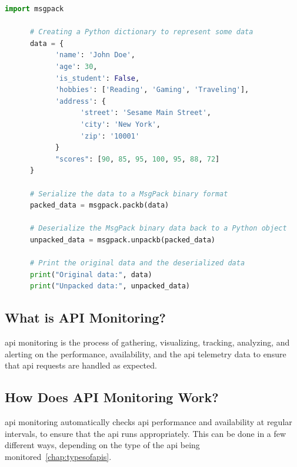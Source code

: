 \begin{lstlisting}[language=Python, caption=MsgPack Serialization and Deserialization in Python]
      import msgpack

      # Creating a Python dictionary to represent some data
      data = {
            'name': 'John Doe',
            'age': 30,
            'is_student': False,
            'hobbies': ['Reading', 'Gaming', 'Traveling'],
            'address': {
                  'street': 'Sesame Main Street',
                  'city': 'New York',
                  'zip': '10001'
            }
            "scores": [90, 85, 95, 100, 95, 88, 72]
      }

      # Serialize the data to a MsgPack binary format
      packed_data = msgpack.packb(data)

      # Deserialize the MsgPack binary data back to a Python object
      unpacked_data = msgpack.unpackb(packed_data)

      # Print the original data and the deserialized data
      print("Original data:", data)
      print("Unpacked data:", unpacked_data)
\end{lstlisting}


\subsection{What is API Monitoring?}
\acrshort{api} monitoring is the process of gathering, visualizing, tracking, analyzing, and alerting on the
performance, availability, and the \acrshort{api} telemetry data to ensure that \acrshort{api} requests are
handled as expected.
\subsection{How Does API Monitoring Work?}
\acrshort{api} monitoring automatically checks \acrshort{api} performance and availability at regular intervals,
to ensure that the \acrshort{api} runs appropriately. This can be done in a few different ways, depending on the
type of the \acrshort{api} being monitored~\ref{chap:typesofapis}.

